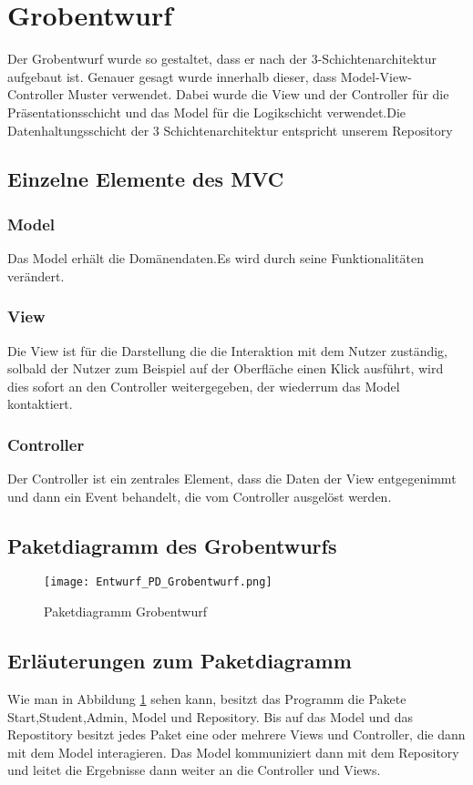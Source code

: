 \documentclass[a4paper,10pt]{article}
\begin{document}
\section{Grobentwurf}
Der Grobentwurf wurde so gestaltet, dass er nach der 3-Schichtenarchitektur aufgebaut ist. Genauer gesagt wurde innerhalb dieser, dass Model-View-Controller Muster verwendet. 
Dabei wurde die View und der Controller für die Präsentationsschicht und das Model für die Logikschicht verwendet.Die Datenhaltungsschicht der 3 Schichtenarchitektur entspricht unserem Repository

\subsection{Einzelne Elemente des MVC}
  \subsubsection{Model} 
    Das Model erhält die Domänendaten.Es wird durch seine Funktionalitäten verändert.
   \subsubsection{View}
   Die View ist für die Darstellung die die Interaktion mit dem Nutzer zuständig, solbald der Nutzer zum Beispiel auf der Oberfläche einen Klick ausführt, wird dies sofort an den Controller weitergegeben, der wiederrum das Model kontaktiert.
   \subsubsection{Controller}
   Der Controller ist ein zentrales Element, dass die Daten der View entgegenimmt und dann ein Event behandelt, die vom Controller ausgelöst werden.
   \subsection{Paketdiagramm des Grobentwurfs}
   \begin{figure}
    \texttt{[image: Entwurf\_PD\_Grobentwurf.png]}
    \label{fig:Paketdiagramm_Grobentwurf}
    \caption{Paketdiagramm Grobentwurf}
   \end{figure} 

   \subsection{Erläuterungen zum Paketdiagramm}
   Wie man in Abbildung \ref{fig:Paketdiagramm_Grobentwurf} sehen kann, besitzt das Programm die Pakete Start,Student,Admin, Model und Repository.
   Bis auf das Model und das Repostitory besitzt jedes Paket eine oder mehrere Views und Controller, die dann mit dem Model interagieren. Das Model kommuniziert dann mit dem Repository und leitet die Ergebnisse dann weiter an die Controller und Views.
   \newpage
\end{document}
